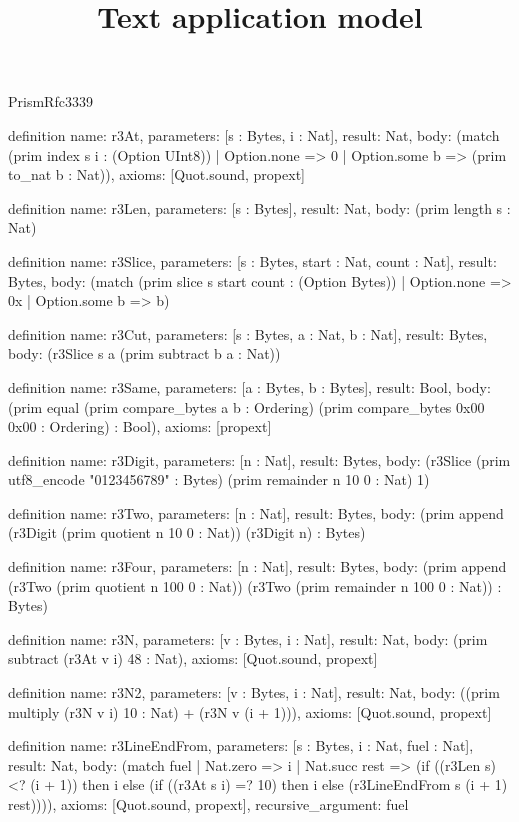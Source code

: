\begin{lexlean}{PrismRfc3339}
\title{Text application model}
\begin{semanticmodule}
definition{
  name: r3At,
  parameters: [s : Bytes, i : Nat],
  result: Nat,
  body: (match (prim index s i : (Option UInt8))
    | Option.none => 0
    | Option.some b => (prim to_nat b : Nat)),
  axioms: [Quot.sound, propext]
}

definition{
  name: r3Len,
  parameters: [s : Bytes],
  result: Nat,
  body: (prim length s : Nat)
}

definition{
  name: r3Slice,
  parameters: [s : Bytes, start : Nat, count : Nat],
  result: Bytes,
  body: (match (prim slice s start count : (Option Bytes))
    | Option.none => 0x
    | Option.some b => b)
}

definition{
  name: r3Cut,
  parameters: [s : Bytes, a : Nat, b : Nat],
  result: Bytes,
  body: (r3Slice s a (prim subtract b a : Nat))
}

definition{
  name: r3Same,
  parameters: [a : Bytes, b : Bytes],
  result: Bool,
  body: (prim equal (prim compare_bytes a b : Ordering) (prim compare_bytes 0x00 0x00 : Ordering) : Bool),
  axioms: [propext]
}

definition{
  name: r3Digit,
  parameters: [n : Nat],
  result: Bytes,
  body: (r3Slice (prim utf8_encode "0123456789" : Bytes) (prim remainder n 10 0 : Nat) 1)
}

definition{
  name: r3Two,
  parameters: [n : Nat],
  result: Bytes,
  body: (prim append (r3Digit (prim quotient n 10 0 : Nat)) (r3Digit n) : Bytes)
}

definition{
  name: r3Four,
  parameters: [n : Nat],
  result: Bytes,
  body: (prim append (r3Two (prim quotient n 100 0 : Nat)) (r3Two (prim remainder n 100 0 : Nat)) : Bytes)
}

definition{
  name: r3N,
  parameters: [v : Bytes, i : Nat],
  result: Nat,
  body: (prim subtract (r3At v i) 48 : Nat),
  axioms: [Quot.sound, propext]
}

definition{
  name: r3N2,
  parameters: [v : Bytes, i : Nat],
  result: Nat,
  body: ((prim multiply (r3N v i) 10 : Nat) + (r3N v (i + 1))),
  axioms: [Quot.sound, propext]
}

definition{
  name: r3LineEndFrom,
  parameters: [s : Bytes, i : Nat, fuel : Nat],
  result: Nat,
  body: (match fuel
    | Nat.zero => i
    | Nat.succ rest => (if ((r3Len s) <? (i + 1)) then i else (if ((r3At s i) =? 10) then i else (r3LineEndFrom s (i + 1) rest)))),
  axioms: [Quot.sound, propext],
  recursive_argument: fuel
}


\end{semanticmodule}
\end{lexlean}
